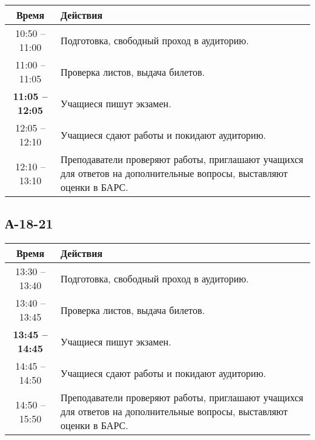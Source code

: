 \documentclass[a4paper,12pt]{article}
\begin{document}
\begin{center}
    \begin{tabular}{|c|p{10cm}|}
        \hline
        Время                   & Действия                                                                                                             \\
        \hline
        10:50 -- 11:00          & Подготовка, свободный проход в аудиторию.                                                                            \\
        \hline
        11:00 -- 11:05          & Проверка листов, выдача билетов.                                                                                     \\
        \hline
        \textbf{11:05 -- 12:05} & Учащиеся пишут экзамен.                                                                                              \\
        \hline
        12:05 -- 12:10          & Учащиеся сдают работы и покидают аудиторию.                                                                          \\
        \hline
        12:10 -- 13:10          & Преподаватели проверяют работы, приглашают учащихся для ответов на дополнительные вопросы, выставляют оценки в БАРС. \\
        \hline
    \end{tabular}
\end{center}

\subsection{А-18-21}

\begin{center}
    \begin{tabular}{|c|p{10cm}|}
        \hline
        Время                   & Действия                                                                                                             \\
        \hline
        13:30 -- 13:40          & Подготовка, свободный проход в аудиторию.                                                                            \\
        \hline
        13:40 -- 13:45          & Проверка листов, выдача билетов.                                                                                     \\
        \hline
        \textbf{13:45 -- 14:45} & Учащиеся пишут экзамен.                                                                                              \\
        \hline
        14:45 -- 14:50          & Учащиеся сдают работы и покидают аудиторию.                                                                          \\
        \hline
        14:50 -- 15:50          & Преподаватели проверяют работы, приглашают учащихся для ответов на дополнительные вопросы, выставляют оценки в БАРС. \\
        \hline
    \end{tabular}
\end{center}
\end{document}
